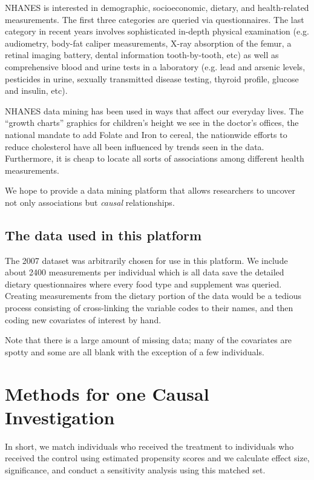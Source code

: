 \documentclass[12pt]{article}
\begin{document}
NHANES is interested in demographic, socioeconomic, dietary, and health-related measurements. The first three categories are queried via questionnaires. The last category in recent years involves sophisticated in-depth physical examination (e.g. audiometry, body-fat caliper measurements, X-ray absorption of the femur, a retinal imaging battery, dental information tooth-by-tooth, etc) as well as comprehensive blood and urine tests in a laboratory (e.g. lead and arsenic levels, pesticides in urine, sexually transmitted disease testing, thyroid profile, glucose and insulin, etc). 

NHANES data mining has been used in ways that affect our everyday lives. The ``growth charts'' graphics for children's height we see in the doctor's offices, the national mandate to add Folate and Iron to cereal, the nationwide efforts to reduce cholesterol have all been influenced by trends seen in the data. Furthermore, it is cheap to locate all sorts of associations among different health measurements. 

We hope to provide a data mining platform that allows researchers to uncover not only associations but \textit{causal} relationships.

\subsection{The data used in this platform} %

The 2007 dataset was arbitrarily chosen for use in this platform. We include about 2400 measurements per individual which is all data save the detailed dietary questionnaires where every food type and supplement was queried. Creating measurements from the dietary portion of the data would be a tedious process consisting of cross-linking the variable codes to their names, and then coding new covariates of interest by hand.

Note that there is a large amount of missing data; many of the covariates are spotty and some are all blank with the exception of a few individuals. 


\section{Methods for one Causal Investigation}\label{sec:one_comp_methods}

In short, we match individuals who received the treatment to individuals who received the control using estimated propensity scores and we calculate effect size, significance, and conduct a sensitivity analysis using this matched set.
\end{document}
